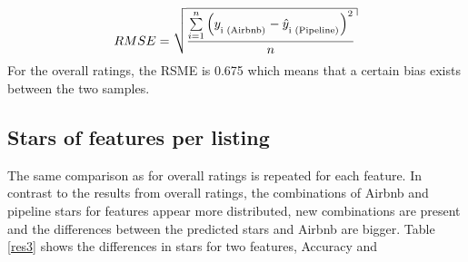 $$ RMSE = \sqrt {{\frac{{\sum\limits_{{i = 1}}^n {{{\left( {{y_\textsubscript{i (Airbnb)}} - {{\hat{y}}_\textsubscript{i (Pipeline)}}} \right)}^2}} }}{{n}}}}$$
For the overall ratings, the RSME is 0.675 which means that a certain bias exists between the two samples. 
%
%
%
\subsection{Stars of features per listing}
The same comparison as for overall ratings is repeated for each feature. In contrast to the results from overall ratings, the combinations of Airbnb and pipeline stars for features appear more distributed, new combinations are present and the differences between the predicted stars and Airbnb are bigger. Table \ref{res3} shows the differences in stars for two features, Accuracy and 
%
%
